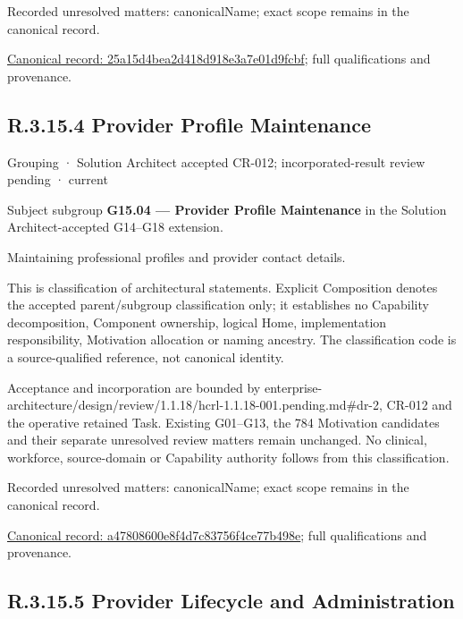 {\small Recorded unresolved matters: canonicalName; exact scope remains in the canonical record.}\par
{\footnotesize \href{../../../../continuum/grouping/25a15d4bea2d418d918e3a7e01d9fcbf.md}{Canonical record: 25a15d4bea2d418d918e3a7e01d9fcbf}; full qualifications and provenance.}\par
\subsection*{R.3.15.4 Provider Profile Maintenance}
\label{navigation:R.3.15.4}

\label{element:a47808600e8f4d7c83756f4ce77b498e}
{\small Grouping · Solution Architect accepted CR-012; incorporated-result review pending · current}\par

Subject subgroup \textbf{G15.04 — Provider Profile Maintenance} in the Solution Architect-accepted G14–G18 extension.



Maintaining professional profiles and provider contact details.



This is classification of architectural statements. Explicit Composition denotes the accepted parent/subgroup classification only; it establishes no Capability decomposition, Component ownership, logical Home, implementation responsibility, Motivation allocation or naming ancestry. The classification code is a source-qualified reference, not canonical identity.



Acceptance and incorporation are bounded by enterprise-architecture/design/review/1.1.18/hcrl-1.1.18-001.pending.md\#dr-2, CR-012 and the operative retained Task. Existing G01–G13, the 784 Motivation candidates and their separate unresolved review matters remain unchanged. No clinical, workforce, source-domain or Capability authority follows from this classification.


{\small Recorded unresolved matters: canonicalName; exact scope remains in the canonical record.}\par
{\footnotesize \href{../../../../continuum/grouping/a47808600e8f4d7c83756f4ce77b498e.md}{Canonical record: a47808600e8f4d7c83756f4ce77b498e}; full qualifications and provenance.}\par
\subsection*{R.3.15.5 Provider Lifecycle and Administration}
\label{navigation:R.3.15.5}

